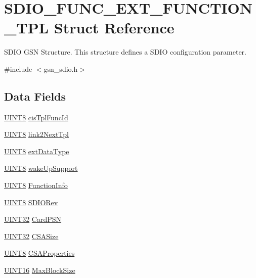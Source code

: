 \hypertarget{a00458}{
\section{SDIO\_\-FUNC\_\-EXT\_\-FUNCTION\_\-TPL Struct Reference}
\label{a00458}
}


SDIO GSN Structure. This structure defines a SDIO configuration parameter.  




{\ttfamily \#include $<$gsn\_\-sdio.h$>$}

\subsection*{Data Fields}
\begin{DoxyCompactItemize}
\item 
\hyperlink{a00660_gab27e9918b538ce9d8ca692479b375b6a}{UINT8} \hyperlink{a00458_ae897ef59d4aba6192fbb03c505363471}{cisTplFuncId}
\item 
\hyperlink{a00660_gab27e9918b538ce9d8ca692479b375b6a}{UINT8} \hyperlink{a00458_adb5f177f5de86565991790a9c2c079b5}{link2NextTpl}
\item 
\hyperlink{a00660_gab27e9918b538ce9d8ca692479b375b6a}{UINT8} \hyperlink{a00458_a9a5846f590be15f9dd50cd27bd15eff3}{extDataType}
\item 
\hyperlink{a00660_gab27e9918b538ce9d8ca692479b375b6a}{UINT8} \hyperlink{a00458_a8a7856ebd7f5cdd38da9f4c76764c776}{wakeUpSupport}
\item 
\hyperlink{a00660_gab27e9918b538ce9d8ca692479b375b6a}{UINT8} \hyperlink{a00458_a5feef1563bcb9f6a201a2f8cc1ee9767}{FunctionInfo}
\item 
\hyperlink{a00660_gab27e9918b538ce9d8ca692479b375b6a}{UINT8} \hyperlink{a00458_a33e2ba9931ca5b1d35bd575c69e34480}{SDIORev}
\item 
\hyperlink{a00660_gae1e6edbbc26d6fbc71a90190d0266018}{UINT32} \hyperlink{a00458_afb491caeb31470f9deb06462c2ae0c4b}{CardPSN}
\item 
\hyperlink{a00660_gae1e6edbbc26d6fbc71a90190d0266018}{UINT32} \hyperlink{a00458_ab88a047a17a05ef47d6b16126fb66619}{CSASize}
\item 
\hyperlink{a00660_gab27e9918b538ce9d8ca692479b375b6a}{UINT8} \hyperlink{a00458_ae01801ec4119fc7fdb57d19dbc687d4c}{CSAProperties}
\item 
\hyperlink{a00660_ga09f1a1fb2293e33483cc8d44aefb1eb1}{UINT16} \hyperlink{a00458_a2da20c6389f0b2ea9069f7cdda89fec6}{MaxBlockSize}

\end{DoxyCompactItemize}
